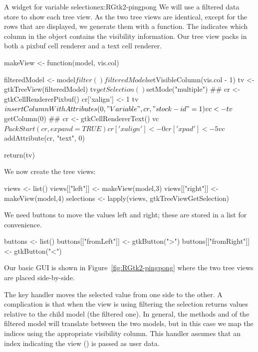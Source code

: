 \begin{example}{A widget for variable selection}{ex:RGtk2-pingpong}
We will use a filtered data store to show each tree view.
As the two tree views are identical, except for the rows that are
displayed, we generate them with a function. The 
indicates which column in the  object contains the
visibility information. Our tree view packs in both a pixbuf cell
renderer and a text cell renderer.
\begin{Schunk}
\begin{Sinput}
 makeView <- function(model, vis.col) {
   filteredModel <- model$filter()
   filteredModel$setVisibleColumn(vis.col - 1)
   tv <- gtkTreeView(filteredModel)
   tv$getSelection()$setMode("multiple")
   ##
   cr <- gtkCellRendererPixbuf()
   cr['xalign'] <- 1
   tv$insertColumnWithAttributes(0, "Variable", cr, "stock-id" = 1)
   vc <- tv$getColumn(0)
   ##
   cr <- gtkCellRendererText()
   vc$PackStart(cr, expand=TRUE)
   cr['xalign'] <- 0
   cr['xpad'] <- 5
   vc$addAttribute(cr, "text", 0)
 
   return(tv)
 }
\end{Sinput}
\end{Schunk}
We now create the tree views:
\begin{Schunk}
\begin{Sinput}
 views <- list()
 views[["left"]] <- makeView(model,3)
 views[["right"]] <- makeView(model,4)
 selections <- lapply(views, gtkTreeViewGetSelection)
\end{Sinput}
\end{Schunk}
We need buttons to move the values left and right; these are stored
in a list for convenience.
\begin{Schunk}
\begin{Sinput}
 buttons <- list()
 buttons[["fromLeft"]] <- gtkButton(">")
 buttons[["fromRight"]] <- gtkButton("<")
\end{Sinput}
\end{Schunk}

Our basic GUI is shown in Figure~\ref{fig:RGtk2-pingpong} where the
two tree views are placed side-by-side.

The key handler moves the selected value from one side to the other. A
complication is that when the view is using filtering the selection
returns values relative to the child model (the filtered one). In
general, the methods  and
 of the filtered model will translate
between the two models, but in this case we map the indices using the
appropriate visibility column. This handler assumes that an index
indicating the view () is passed as user data.
\begin{Schunk}
\end{Schunk}
\end{example}
